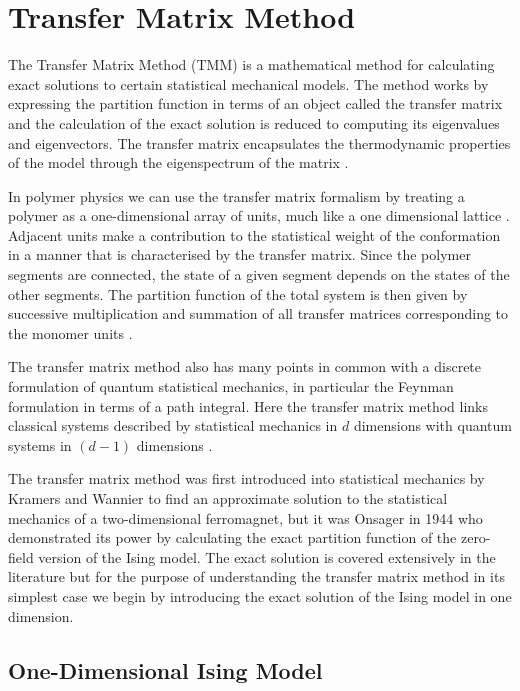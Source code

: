 \chapter{Transfer Matrix Method}

The Transfer Matrix Method (TMM) is a mathematical method for calculating exact solutions to certain statistical mechanical models. The method works by  expressing the partition function in terms of an object called the transfer matrix and the calculation of the exact solution is reduced to  computing its eigenvalues and eigenvectors. The transfer matrix encapsulates the thermodynamic properties of the model through the eigenspectrum of the matrix \cite{Yeomans1992}.

In polymer physics we can use the transfer matrix formalism by treating a polymer as a one-dimensional array of units, much like a one dimensional lattice \cite{Zimm1960,Wartell1985}. Adjacent units make a contribution to the statistical weight of the conformation in a manner that is characterised by the transfer matrix. Since the polymer segments are connected, the state of a given segment depends on the states of the other segments. The partition function of the total system is then given by successive multiplication and summation of all transfer matrices corresponding to the monomer units \cite{Poland1966,Carlon2007}.

The transfer matrix method also has many points in common with a discrete formulation of quantum statistical mechanics, in particular the Feynman formulation in terms of a path integral. Here the transfer matrix method links classical systems described by statistical mechanics in $d$ dimensions with quantum systems in $(d-1)$ dimensions \cite{Parisi1998}.

The transfer matrix method was first introduced into statistical mechanics by Kramers and Wannier \cite{Kramers1941} to find an approximate solution to the statistical mechanics of a two-dimensional ferromagnet, but it was Onsager \cite{Onsager1944} in 1944 who demonstrated its power by calculating the exact partition function of the zero-field version of the Ising model.  The exact solution is covered extensively in the literature \cite{Brush1967, Plischke2006, Yeomans1992, Baxter1982, Newell1953} but for the purpose of understanding the transfer matrix method in its simplest case we begin by introducing the exact solution of the Ising model in one dimension.

\section{One-Dimensional Ising Model}

